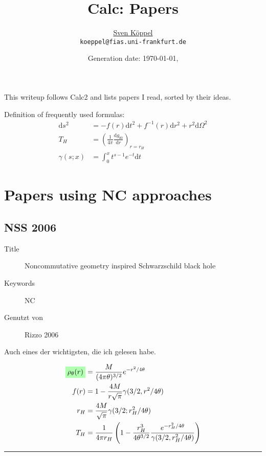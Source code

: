 \documentclass[10pt,a4paper, fleqn]{article}
\title{\vspace{-9ex} Calc: Papers \vspace{-1ex}} %
\author{\small %
\href{https://itp.uni-frankfurt.de/~koeppel}{Sven Köppel} \\
\small \texttt{koeppel@fias.uni-frankfurt.de}}
\date{\small Generation date: \today, \currenttime}
\newcommand{\highlight}[1]{%
  \colorbox{green!30}{$\displaystyle#1$}}
\begin{document}
\maketitle

\renewcommand{\d}{\mathrm{d}}
\newcommand{\dd}[2]{\frac{\mathrm{d} #1}{\mathrm{d} #2}}
\renewcommand{\L}{L_P}
\newcommand{\pr}{p_r}
\newcommand{\psenk}{p_\perp}
\newcommand{\ebenso}{\biggl( ~ \therefore ~ \biggr) }
\newcommand{\metrik}[1]{\d s^2 = \left( #1 \right) \d t^2 \left( #1 \right)^{-1} \d r^2 + r^2 \d \Omega^2 }
\newcommand{\winkel}{r^2 \d \Omega^2}
\newcommand{\dann}{$\rightarrow~$}

\begin{multicols}{2}
This writeup follows Calc2 and lists papers I read, sorted by their ideas.

\vspace{1.3cm}
Definition of frequently used formulas:
%
\begin{align*}
\d s^2 &= -f(r) \d t^2 + f^{-1}(r) \d r^2 + r^2 \d \Omega^2 \\
T_H &= \left( \frac{1}{4 \pi} \dd{g_{00}}{r} \right)_{r=r_H} \\
\gamma(s;x) &= \int_0^x t^{s-1} e^{-t} \d t
\end{align*}
%
\columnbreak
\tableofcontents
\end{multicols}
\section{Papers using NC approaches}
\begin{multicols}{2}
\subsection{NSS 2006} \label{NSS 2006}
\begin{description}
  \item[Title] Noncommutative geometry inspired Schwarzschild black hole
  \item[Keywords] NC
  \item[Genutzt von] Rizzo 2006
\end{description}

Auch eines der wichtigsten, die ich gelesen habe.


\vfill
\columnbreak
\begin{align}
\highlight{ \rho_\theta(r)}  &= \frac{M}{(4 \pi \theta)^{3/2}} e^{-r^2 / 4 \theta} \\
f(r) &= 1 - \frac{4 M }{r \sqrt{\pi}} \gamma(3/2, r^2/4\theta) \\
r_H & = \frac{4M}{\sqrt{\pi}} \gamma(3/2; r_H^2 / 4\theta) \\
T_H &= \frac{1}{4 \pi r_H} \left( 1 - \frac{r^3_H}{4 \theta^{3/2}} \frac{e^{-r^2_H / 4 \theta}}{\gamma(3/2, r_H^2 / 4 \theta)} \right)  %
\end{align}
\vfill

\end{multicols}
\rule{0.9\textwidth}{0.4pt}
\end{document}

